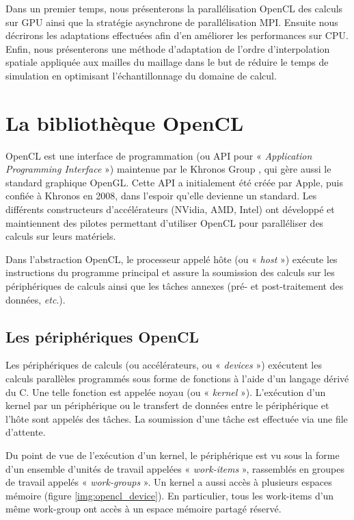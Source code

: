 Dans un premier temps, nous présenterons la parallélisation OpenCL des calculs
sur GPU ainsi que la stratégie asynchrone
de parallélisation MPI.
Ensuite nous décrirons les adaptations effectuées afin d'en améliorer
les performances sur CPU.
Enfin, nous présenterons une méthode d'adaptation de l'ordre d'interpolation
spatiale appliquée aux mailles du maillage dans le but de réduire le temps
de simulation en optimisant l'échantillonnage du domaine de calcul.
\\


\section{La bibliothèque OpenCL}
\label{sect:librairie_opencl}

OpenCL est une interface de programmation
(ou API pour « \textit{Application Programming Interface} ») maintenue par le Khronos Group
\cite{opencl}, qui gère aussi le standard graphique OpenGL.
Cette API a initialement été créée par Apple, puis confiée à Khronos en 2008,
dans l’espoir qu’elle devienne un standard. Les différents constructeurs
d'accélérateurs (NVidia, AMD, Intel) ont développé et maintiennent
des pilotes permettant d’utiliser OpenCL pour paralléliser des calculs sur
leurs matériels.

Dans l’abstraction OpenCL, le processeur appelé hôte (ou « \textit{host} ») exécute les
instructions du programme principal et assure la soumission des calculs sur les
périphériques de calculs ainsi que les tâches annexes (pré- et post-traitement
des données, \textit{etc}.).
\\

\subsection{Les périphériques OpenCL}
\label{ssect:peripheriques_opencl}

Les périphériques de calculs (ou accélérateurs, ou « \textit{devices} ») exécutent les calculs
parallèles programmés sous forme de fonctions à l'aide d'un langage dérivé du C.
Une telle fonction est appelée noyau (ou « \textit{kernel} »). L'exécution d'un kernel
par un périphérique ou le transfert de données entre le périphérique et l'hôte
sont appelés des tâches. La soumission d'une tâche est effectuée via une file
d’attente.

Du point de vue de l’exécution d’un kernel, le périphérique est vu sous
la forme d’un ensemble d’unités de travail appelées « \textit{work-items} », rassemblés
en groupes de travail appelés « \textit{work-groups} ». Un kernel a aussi accès à plusieurs
espaces mémoire (figure \ref{img:opencl_device}). En particulier, tous les
work-items d'un même work-group ont accès à un espace mémoire partagé réservé.
\\


